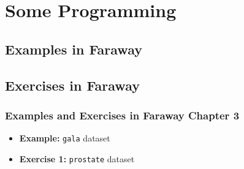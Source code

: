 \documentclass[serif,mathserif,professionalfont]{beamer}
\begin{document}
\section{Some Programming}


\subsection{Examples in Faraway}

\subsection{Exercises in Faraway}


\begin{frame}
	
	\frametitle{Examples and Exercises in Faraway Chapter 3}
	
	
	\begin{itemize}
		\item \textbf{Example:} \texttt{gala} dataset
		\item \textbf{Exercise 1:} \texttt{prostate} dataset
	\end{itemize}
	
	
	
\end{frame}

















\end{document}

